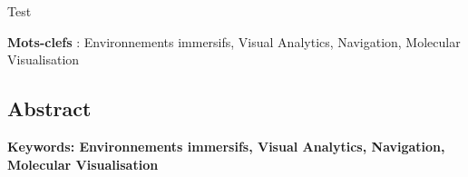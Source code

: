 Test

\textbf{Mots-clefs} : Environnements immersifs, Visual Analytics, Navigation, Molecular Visualisation


\begin{otherlanguage}{english}

%
  
\subsection*{Abstract}
  
\footnotesize

\textbf{Keywords: Environnements immersifs, Visual Analytics, Navigation, Molecular Visualisation} 

\end{otherlanguage} 